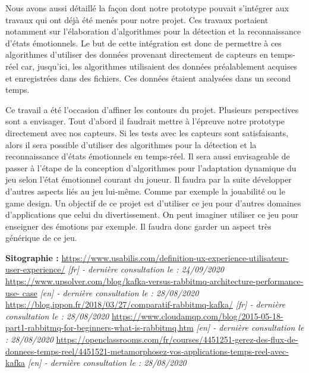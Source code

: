 \documentclass[11pt]{article}
\begin{document}
	Nous avons aussi détaillé la façon dont notre prototype pouvait s'intégrer aux travaux qui ont déjà été menés pour notre projet.
	Ces travaux portaient notamment sur l'élaboration d'algorithmes pour la détection et la reconnaissance d'états émotionnels.
	Le but de cette intégration est donc de permettre à ces algorithmes d'utiliser des données provenant directement de capteurs en temps-réel car, jusqu'ici, les algorithmes utilisaient des données préalablement acquises et enregistrées dans des fichiers. 
	Ces données étaient analysées dans un second temps.\par
	Ce travail a été l'occasion d'affiner les contours du projet.
	Plusieurs perspectives sont a envisager.
	Tout d'abord il faudrait mettre à l'épreuve notre prototype directement avec nos capteurs.
	Si les tests avec les capteurs sont satisfaisants, alors il sera possible d'utiliser des algorithmes pour la détection et la reconnaissance d'états émotionnels en temps-réel.
	Il sera aussi envisageable de passer à l'étape de la conception d'algorithmes pour l'adaptation dynamique du jeu selon l'état émotionnel courant du joueur.
	Il faudra par la suite développer d'autres aspects liés au jeu lui-même.
	Comme par exemple la jouabilité ou le game design.
	Un objectif de ce projet est d'utiliser ce jeu pour d'autres domaines d'applications que celui du divertissement.
	On peut imaginer utiliser ce jeu pour enseigner des émotions par exemple.
	Il faudra donc garder un aspect très générique de ce jeu.


\newpage


\medskip

\hspace*{-1cm}
\Large{\textbf{Sitographie :}}\newline
\href{https://www.usabilis.com/definition-ux-experience-utilisateur-user-experience/}{https://www.usabilis.com/definition-ux-experience-utilisateur-user-experience/} \textit{[fr] - dernière consultation le : 24/09/2020}\newline
\href{https://www.upsolver.com/blog/kafka-versus-rabbitmq-architecture-performance-use-
case}{https://www.upsolver.com/blog/kafka-versus-rabbitmq-architecture-performance-use-
case} \textit{[en] - dernière consultation le : 28/08/2020} \medskip\newline
\href{https://blog.ippon.fr/2018/03/27/comparatif-rabbitmq-kafka/}{https://blog.ippon.fr/2018/03/27/comparatif-rabbitmq-kafka/} \textit{[fr] - dernière consultation le : 28/08/2020}\medskip\newline
\href{https://www.cloudamqp.com/blog/2015-05-18-part1-rabbitmq-for-beginners-what-is-rabbitmq.htm}{https://www.cloudamqp.com/blog/2015-05-18-part1-rabbitmq-for-beginners-what-is-rabbitmq.htm} \textit{[en] - dernière consultation le : 28/08/2020}\medskip\newline
\href{https://openclassrooms.com/fr/courses/4451251-gerez-des-flux-de-donnees-temps-reel/4451521-metamorphosez-vos-applications-temps-reel-avec-kafka}{https://openclassrooms.com/fr/courses/4451251-gerez-des-flux-de-donnees-temps-reel/4451521-metamorphosez-vos-applications-temps-reel-avec-kafka} \textit{[en] - dernière consultation le : 28/08/2020}\newline
\end{document}
